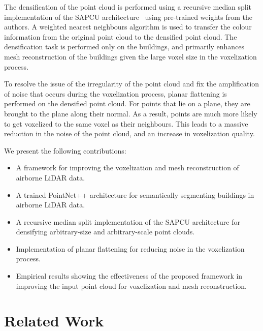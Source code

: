 \documentclass[10pt,twocolumn,letterpaper]{article}
\begin{document}
    The densification of the point cloud is performed using a recursive median split implementation of the SAPCU architecture~\cite{sapcu} using pre-trained weights from the authors.
    A weighted nearest neighbours algorithm is used to transfer the colour information from the original point cloud to the densified point cloud.
    The densification task is performed only on the buildings, and primarily enhances mesh reconstruction of the buildings given the large voxel size in the voxelization process.

    To resolve the issue of the irregularity of the point cloud and fix the amplification of noise that occurs during the voxelization process, planar flattening is performed on the densified point cloud.
    For points that lie on a plane, they are brought to the plane along their normal.
    As a result, points are much more likely to get voxelized to the same voxel as their neighbours.
    This leads to a massive reduction in the noise of the point cloud, and an increase in voxelization quality.

    We present the following contributions:
    \begin{itemize}
        \item A framework for improving the voxelization and mesh reconstruction of airborne LiDAR data.
        \item A trained PointNet++ architecture for semantically segmenting buildings in airborne LiDAR data.
        \item A recursive median split implementation of the SAPCU architecture for densifying arbitrary-size and arbitrary-scale point clouds.
        \item Implementation of planar flattening for reducing noise in the voxelization process.
        \item Empirical results showing the effectiveness of the proposed framework in improving the input point cloud for voxelization and mesh reconstruction.
        \end{itemize}

        

    \section{Related Work}\label{sec:related-work}
\end{document}
